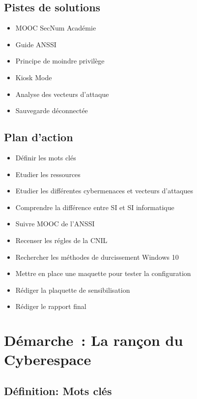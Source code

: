 \subsection*{Pistes de solutions}
{}
\begin{itemize}
  \item MOOC SecNum Académie
  \item Guide ANSSI
  \item Principe de moindre privilège
  \item Kiosk Mode
  \item Analyse des vecteurs d'attaque
  \item Sauvegarde déconnectée
\end{itemize}

\subsection*{Plan d'action}
{}
\begin{itemize}
  \item Définir les mots clés
  \item Etudier les ressources
  \item Etudier les différentes cybermenaces et vecteurs d'attaques
  \item Comprendre la différence entre SI et SI informatique
  \item Suivre MOOC de l'ANSSI
  \item Recenser les régles de la CNIL
  \item Rechercher les méthodes de durcissement Windows 10
  \item Mettre en place une maquette pour tester la configuration
  \item Rédiger la plaquette de sensibilisation
  \item Rédiger le rapport final
\end{itemize}

\clearpage
\section*{Démarche~: La rançon du Cyberespace}

\subsection*{Définition: Mots clés}
{}

